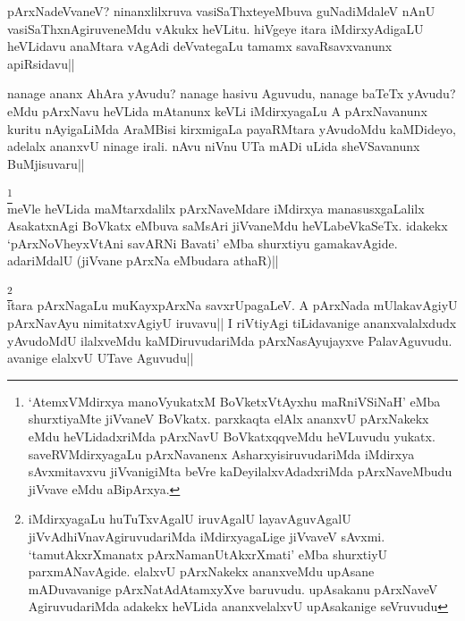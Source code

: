 \stext

\begin{artha}
pArxNadeVvaneV? ninanxlilxruva vasiSaThxteyeMbuva guNadiMdaleV nAnU 
vasiSaThxnAgiruveneMdu vAkukx heVLitu. hiVgeye itara iMdirxyAdigaLU 
heVLidavu anaMtara vAgAdi deVvategaLu tamamx savaRsavxvanunx 
apiRsidavu||
\end{artha}


\begin{artha}
nanage ananx AhAra yAvudu? nanage hasivu Aguvudu, nanage baTeTx 
yAvudu? eMdu pArxNavu heVLida mAtanunx keVLi iMdirxyagaLu A 
pArxNavanunx kuritu nAyigaLiMda AraMBisi kirxmigaLa payaRMtara 
yAvudoMdu kaMDideyo, adelalx ananxvU ninage irali. nAvu niVnu UTa mADi 
uLida sheVSavanunx BuMjisuvaru|| 
\end{artha}


\begin{artha}
\footnote[1]{`AtemxVMdirxya manoVyukatxM BoVketxVtAyxhu maRniVSiNaH' 
eMba shurxtiyaMte jiVvaneV BoVkatx. parxkaqta elAlx ananxvU pArxNakekx 
eMdu heVLidadxriMda pArxNavU BoVkatxqqveMdu heVLuvudu yukatx. 
saveRVMdirxyagaLu pArxNavanenx AsharxyisiruvudariMda iMdirxya 
sAvxmitavxvu jiVvanigiMta beVre kaDeyilalxvAdadxriMda pArxNaveMbudu 
jiVvave eMdu aBipArxya.}\\
meVle heVLida maMtarxdalilx pArxNaveMdare iMdirxya manasusxgaLalilx 
AsakatxnAgi BoVkatx eMbuva saMsAri jiVvaneMdu heVLabeVkaSeTx. idakekx 
`pArxNoVheyxVtAni savARNi Bavati' eMba shurxtiyu gamakavAgide. 
adariMdalU (jiVvane pArxNa eMbudara athaR)||
\end{artha}


\begin{artha}
\footnote[2]{iMdirxyagaLu huTuTxvAgalU iruvAgalU layavAguvAgalU 
jiVvAdhiVnavAgiruvudariMda iMdirxyagaLige jiVvaveV sAvxmi. 
`tamutAkxrXmanatx pArxNamanUtAkxrXmati' eMba shurxtiyU parxmANavAgide. 
elalxvU pArxNakekx ananxveMdu upAsane mADuvavanige pArxNatAdAtamxyXve 
baruvudu. upAsakanu pArxNaveV AgiruvudariMda adakekx heVLida 
ananxvelalxvU upAsakanige seVruvudu}\\
itara pArxNagaLu muKayxpArxNa savxrUpagaLeV. A pArxNada mUlakavAgiyU 
pArxNavAyu nimitatxvAgiyU iruvavu|| I riVtiyAgi tiLidavanige 
ananxvalalxdudx yAvudoMdU ilalxveMdu kaMDiruvudariMda pArxNasAyujayxve 
PalavAguvudu. avanige elalxvU UTave Aguvudu||
\end{artha}

